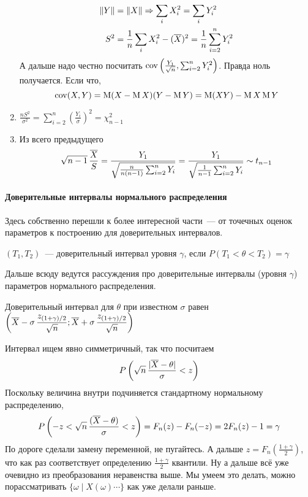 \documentclass[12pt,timbord]{../../../notes}
\begin{document}
\begin{ittproof}
\begin{enumerate}
\begin{align*}
        \|Y\| &= \|X\| \Rightarrow \sum_i X_i^2 = \sum_i Y_i^2 \\
        S^2 &= \frac{1}{n} \sum_i X_i^2 - (\overline{X})^2 = \frac{1}{n} \sum_{i=2}^n Y_i^2
      \end{align*}
      А дальше надо честно посчитать $\operatorname{cov} \left(\frac{Y_1}{\sqrt n}, \sum_{i=2}^n Y_i^2 \right) $.
      Правда ноль получается.
      Если что, \[
        \operatorname{cov} (X,Y) = \operatorname{M} (X-\operatorname{M} X)(Y - \operatorname{M} Y) = \operatorname{M} (XY) - \operatorname{M} X \operatorname{M} Y
      \]
    \item $\displaystyle \frac{n S^2}{\sigma^2}  = \sum_{i=2}^n \left(\frac{Y_i}{\sigma} \right)^2 =
      \chi^2_{n-1}$
    \item Из всего предыдущего  \[
        \displaystyle \sqrt{n-1} \,\frac{\overline{X} }{S} = \frac{Y_1}{ 
        \sqrt{\frac{n}{n(n-1)}\sum_{i=2}^n Y_i}}=\frac{Y_1}{\sqrt{\frac{1}{n-1}\sum_{i=2}^n Y_i}}
        \sim t_{n-1}
      \]
  \end{enumerate}
\end{ittproof}

\paragraph{Доверительные интервалы нормального распределения}
\label{par:stat::trintnorm}

Здесь собственно перешли к более интересной части~--- от точечных оценок параметров к построению
для доверительных интервалов.

\begin{defn}\label{defn:stat::trintnorm::trint}
  $(T_1, T_2)$~--- доверительный интервал уровня $\gamma$, если $P(T_1 < \theta < T_2) = \gamma$
\end{defn}

Дальше всюду ведутся рассуждения про доверительные интервалы (уровня $\gamma$)
параметров нормального распределения.

\begin{prop}\label{prop:stat::trintnorm::qdispkn}
  Доверительный интервал для $\theta$ при известном $\sigma$ равен 
  $\displaystyle \left( \overline{X} - \sigma \, \frac{z_{(1+\gamma)/2}}{\sqrt n} ; 
  \overline{X} + \sigma \, \frac{z_{(1+\gamma)/2}}{ \sqrt n} \right)$
\end{prop}
\begin{itlproof}
  Интервал ищем явно симметричный, так что посчитаем \[
    P\left(\sqrt n \, \frac{|\overline{X} - \theta|}{\sigma} < z \right) 
  \]
  Поскольку величина внутри подчиняется стандартному нормальному распределению, 
  \[
  P\left(-z < \sqrt n \, \frac{(\overline{X} - \theta)}{\sigma} < z \right) = F_n(z) - F_n(-z) = 
  2 F_n(z) - 1 = \gamma
  \]
  По дороге сделали замену переменной, не пугайтесь.
  А дальше $z = F_n\left(\frac{1+\gamma}{2}\right) $, что как раз соответствует определению
  $\frac{1+\gamma}{2} $ квантили. Ну а дальше всё уже очевидно из преобразования неравенства
  выше. Мы умеем это делать, можно порассматривать $\{\omega \mid X(\omega) \cdots \}$ как уже
  делали раньше.
\end{itlproof}
\end{document}
